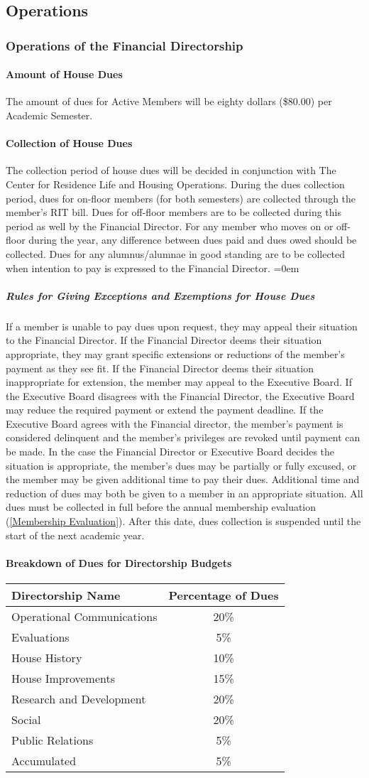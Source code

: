 \documentclass{article}
\newcommand{\asection}[1]{\subsection{#1} \label{#1}}
\newcommand{\asubsection}[1]{\subsubsection{#1} \label{#1}}
\newcommand{\asubsubsection}[1]{\paragraph{#1} \label{#1}}
\newcommand{\asubsubsubsection}[1]{\parindent=0em\subparagraph{#1} \label{#1}}
\begin{document}
\asection{Operations}
\asubsection{Operations of the Financial Directorship}
\asubsubsection{Amount of House Dues}
The amount of dues for Active Members will be eighty dollars (\$80.00) per Academic Semester.
\asubsubsection{Collection of House Dues}
The collection period of house dues will be decided in conjunction with The Center for Residence Life and Housing Operations.
During the dues collection period, dues for on-floor members (for both semesters) are collected through the member’s RIT bill.
Dues for off-floor members are to be collected during this period as well by the Financial Director.
For any member who moves on or off-floor during the year, any difference between dues paid and dues owed should be collected.
Dues for any alumnus/alumnae in good standing are to be collected when intention to pay is expressed to the Financial Director.
\asubsubsubsection{Rules for Giving Exceptions and Exemptions for House Dues}
If a member is unable to pay dues upon request, they may appeal their situation to the Financial Director.
If the Financial Director deems their situation appropriate, they may grant specific extensions or reductions of the member's payment as they see fit.
If the Financial Director deems their situation inappropriate for extension, the member may appeal to the Executive Board.
If the Executive Board disagrees with the Financial Director, the Executive Board may reduce the required payment or extend the payment deadline.
If the Executive Board agrees with the Financial director, the member’s payment is considered delinquent and the member’s privileges are revoked until payment can be made.
In the case the Financial Director or Executive Board decides the situation is appropriate, the member's dues may be partially or fully excused, or the member may be given additional time to pay their dues. 
Additional time and reduction of dues may both be given to a member in an appropriate situation.
All dues must be collected in full before the annual membership evaluation (\ref{Membership Evaluation}).
After this date, dues collection is suspended until the start of the next academic year.
\asubsubsection{Breakdown of Dues for Directorship Budgets}
\begin{center}
\begin{tabular}[c]{|l c|}
\hline
Directorship Name & Percentage of Dues \\
\hline
\hline
Operational Communications & 20\% \\
\hline
Evaluations & 5\% \\
\hline
House History & 10\% \\
\hline
House Improvements & 15\% \\
\hline
Research and Development & 20\% \\
\hline
Social & 20\% \\
\hline
Public Relations & 5\% \\
\hline
Accumulated & 5\% \\
\hline
\end{tabular}
\end{center}
\end{document}
